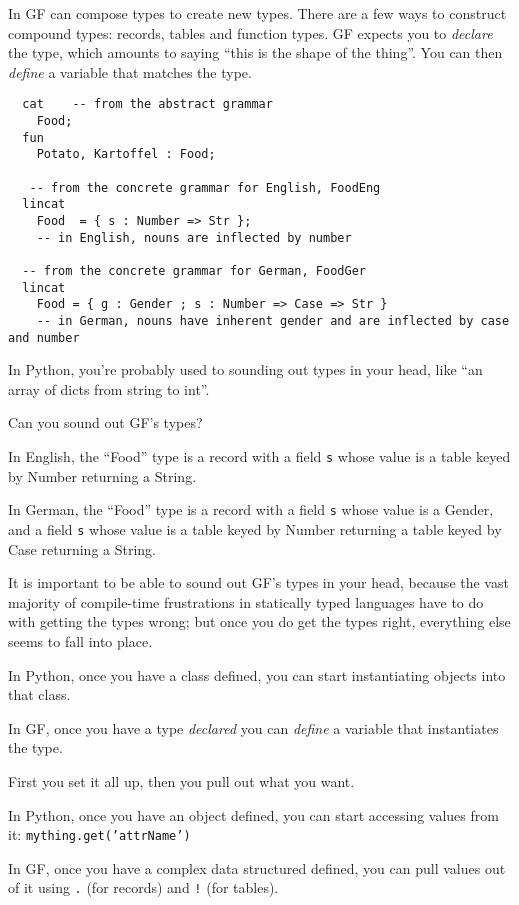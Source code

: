 \documentclass{scrartcl}
\begin{document}
In GF can compose types to create new types. There are a few ways to construct compound types: records, tables and function types. GF expects you to \emph{declare} the type, which amounts to saying ``this is the shape of the thing''. You can then \emph{define} a variable that matches the type.

\begin{verbatim}
  cat    -- from the abstract grammar
    Food;
  fun
    Potato, Kartoffel : Food;

   -- from the concrete grammar for English, FoodEng
  lincat
    Food  = { s : Number => Str };
    -- in English, nouns are inflected by number

  -- from the concrete grammar for German, FoodGer
  lincat
    Food = { g : Gender ; s : Number => Case => Str }
    -- in German, nouns have inherent gender and are inflected by case and number
\end{verbatim}

In Python, you're probably used to sounding out types in your head, like ``an array of dicts from string to int''.

Can you sound out GF's types?

In English, the ``Food'' type is a record with a field \texttt{s} whose value is a table keyed by Number returning a String.

In German, the ``Food'' type is a record with a field \texttt{s} whose value is a Gender, and a field \texttt{s} whose value is a table keyed by Number returning a table keyed by Case returning a String.

It is important to be able to sound out GF's types in your head, because the vast majority of compile-time frustrations in statically typed languages have to do with getting the types wrong; but once you do get the types right, everything else seems to fall into place.

In Python, once you have a class defined, you can start instantiating objects into that class.

In GF, once you have a type \emph{declared} you can \emph{define} a variable that instantiates the type.

First you set it all up, then you pull out what you want.

In Python, once you have an object defined, you can start accessing values from it: \texttt{mything.get('attrName')}

In GF, once you have a complex data structured defined, you can pull values out of it using \texttt{.} (for records) and \texttt{!} (for tables).
\end{document}
